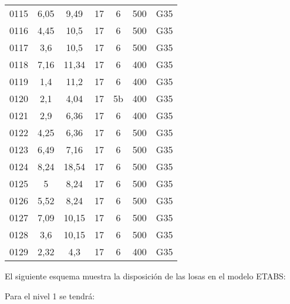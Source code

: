 \begin{table}[H]
\begin{tabular}{ccccccc}
        0115 &      6,05 &      9,49 &      17 &      6 &      500 &      G35      \\
        0116 &      4,45 &      10,5 &      17 &      6 &      500 &      G35      \\
        0117 &      3,6 &      10,5 &      17 &      6 &      500 &      G35      \\
        0118 &      7,16 &      11,34 &      17 &      6 &      400 &      G35      \\
        0119 &      1,4 &      11,2 &      17 &      6 &      400 &      G35      \\
        0120 &      2,1 &      4,04 &      17 &      5b &      400 &      G35      \\
        0121 &      2,9 &      6,36 &      17 &      6 &      400 &      G35      \\
        0122 &      4,25 &      6,36 &      17 &      6 &      500 &      G35      \\
        0123 &      6,49 &      7,16 &      17 &      6 &      500 &      G35      \\
        0124 &      8,24 &      18,54 &      17 &      6 &      500 &      G35      \\
        0125 &      5 &      8,24 &      17 &      6 &      500 &      G35      \\
        0126 &      5,52 &      8,24 &      17 &      6 &      500 &      G35      \\
        0127 &      7,09 &      10,15 &      17 &      6 &      500 &      G35      \\
        0128 &      3,6 &      10,15 &      17 &      6 &      500 &      G35      \\
        0129 &      2,32 &      4,3 &      17 &      6 &      400 &      G35      \bigstrut[b]\\
        \hline
      \end{tabular}
      \label{losas-1}
    \end{table}

\newpage

El siguiente esquema muestra la disposición de las losas en el modelo ETABS:


\newpage

Para el nivel 1 se tendrá:


